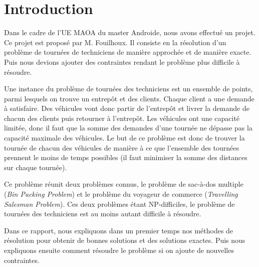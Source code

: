 \section{Introduction}
\label{S introduction}

Dans le cadre de l'UE MAOA du master Androide, nous avons effectué un projet. Ce projet est proposé par M. Fouilhoux. Il consiste en la résolution d'un problème de tournées de techniciens de manière approchée et de manière exacte. Puis nous devions ajouter des contraintes rendant le problème plus difficile à résoudre.

Une instance du problème de tournées des techniciens est un ensemble de points, parmi lesquels on trouve un entrepôt et des clients. Chaque client a une demande à satisfaire. Des véhicules vont donc partir de l'entrepôt et livrer la demande de chacun des clients puis retourner à l'entrepôt. Les véhicules ont une capacité limitée, donc il faut que la somme des demandes d'une tournée ne dépasse pas la capacité maximale des véhicules. Le but de ce problème est donc de trouver la tournée de chacun des véhicules de manière à ce que l'ensemble des tournées prennent le moins de temps possibles (il faut minimiser la somme des distances sur chaque tournée).

Ce problème réunit deux problèmes connus, le problème de sac-à-dos multiple (\textit{Bin Packing Problem}) et le problème du voyageur de commerce (\textit{Travelling Salesman Problem}). Ces deux problèmes étant NP-difficiles, le problème de tournées des techniciens est au moins autant difficile à résoudre.

Dans ce rapport, nous expliquons dans un premier temps nos méthodes de résolution pour obtenir de bonnes solutions et des solutions exactes. Puis nous expliquons ensuite comment résoudre le problème si on ajoute de nouvelles contraintes.